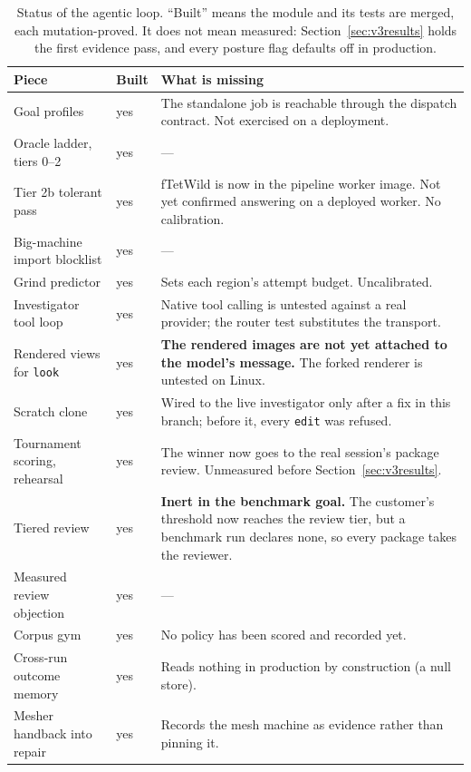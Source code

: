 \documentclass[11pt,onecolumn]{article}
\newcommand{\code}[1]{\texttt{\small #1}}
\begin{document}
\begin{table}[h]
\centering
\caption{Status of the agentic loop. ``Built'' means the module and its tests are merged, each
mutation-proved. It does not mean measured: Section~\ref{sec:v3results} holds the first evidence
pass, and every posture flag defaults off in production.}
\label{tab:v3status}
\footnotesize
\begin{tabularx}{\textwidth}{@{}L{42mm} l X@{}}
\toprule
\textbf{Piece} & \textbf{Built} & \textbf{What is missing}\\
\midrule
Goal profiles                  & yes & The standalone job is reachable through the dispatch contract. Not exercised on a deployment.\\
Oracle ladder, tiers 0--2      & yes & ---\\
Tier 2b tolerant pass          & yes & fTetWild is now in the pipeline worker image. Not yet confirmed answering on a deployed worker. No calibration.\\
Big-machine import blocklist   & yes & ---\\
Grind predictor                & yes & Sets each region's attempt budget. Uncalibrated.\\
Investigator tool loop         & yes & Native tool calling is untested against a real provider; the router test substitutes the transport.\\
Rendered views for \code{look} & yes & \textbf{The rendered images are not yet attached to the model's message.} The forked renderer is untested on Linux.\\
Scratch clone                  & yes & Wired to the live investigator only after a fix in this branch; before it, every \code{edit} was refused.\\
Tournament scoring, rehearsal  & yes & The winner now goes to the real session's package review. Unmeasured before Section~\ref{sec:v3results}.\\
Tiered review                  & yes & \textbf{Inert in the benchmark goal.} The customer's threshold now reaches the review tier, but a benchmark run declares none, so every package takes the reviewer.\\
Measured review objection      & yes & ---\\
Corpus gym                     & yes & No policy has been scored and recorded yet.\\
Cross-run outcome memory       & yes & Reads nothing in production by construction (a null store).\\
Mesher handback into repair    & yes & Records the mesh machine as evidence rather than pinning it.\\
\bottomrule
\end{tabularx}
\end{table}
\end{document}
